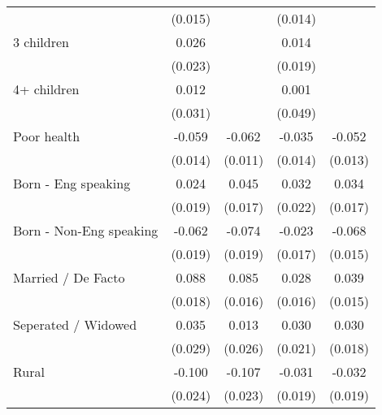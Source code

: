 {\begin{tabular}{l*{4}{c}}
                    &     (0.015)         &                     &     (0.014)         &                     \\
[1em]
3 children          &       0.026         &                     &       0.014         &                     \\
                    &     (0.023)         &                     &     (0.019)         &                     \\
[1em]
4+ children         &       0.012         &                     &       0.001         &                     \\
                    &     (0.031)         &                     &     (0.049)         &                     \\
[1em]
Poor health         &      -0.059\sym{***}&      -0.062\sym{***}&      -0.035\sym{*}  &      -0.052\sym{***}\\
                    &     (0.014)         &     (0.011)         &     (0.014)         &     (0.013)         \\
[1em]
Born - Eng speaking &       0.024         &       0.045\sym{**} &       0.032         &       0.034\sym{*}  \\
                    &     (0.019)         &     (0.017)         &     (0.022)         &     (0.017)         \\
[1em]
Born - Non-Eng speaking&      -0.062\sym{**} &      -0.074\sym{***}&      -0.023         &      -0.068\sym{***}\\
                    &     (0.019)         &     (0.019)         &     (0.017)         &     (0.015)         \\
[1em]
Married / De Facto  &       0.088\sym{***}&       0.085\sym{***}&       0.028         &       0.039\sym{**} \\
                    &     (0.018)         &     (0.016)         &     (0.016)         &     (0.015)         \\
[1em]
Seperated / Widowed &       0.035         &       0.013         &       0.030         &       0.030         \\
                    &     (0.029)         &     (0.026)         &     (0.021)         &     (0.018)         \\
[1em]
Rural               &      -0.100\sym{***}&      -0.107\sym{***}&      -0.031         &      -0.032         \\
                    &     (0.024)         &     (0.023)         &     (0.019)         &     (0.019)         \\

\end{tabular}}
